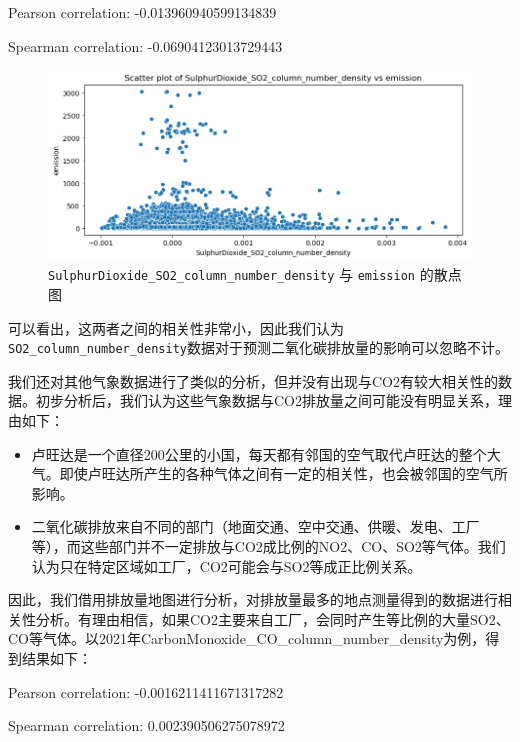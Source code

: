 \documentclass{ctexart}
\begin{document}
\begin{center}
Pearson correlation: -0.013960940599134839

Spearman correlation: -0.06904123013729443
\end{center}


\begin{figure}[H]
      \centering
      \includegraphics[width=1\textwidth]{output1.png}
      \caption{\label{fig:1}\texttt{SulphurDioxide\_SO2\_column\_number\_density} 与 \texttt{emission} 的散点图}
\end{figure}

可以看出，这两者之间的相关性非常小，因此我们认为\texttt{SO2\_column\_number\_density}数据对于预测二氧化碳排放量的影响可以忽略不计。

我们还对其他气象数据进行了类似的分析，但并没有出现与CO2有较大相关性的数据。初步分析后，我们认为这些气象数据与CO2排放量之间可能没有明显关系，理由如下：

\begin{itemize}
      \item 卢旺达是一个直径200公里的小国，每天都有邻国的空气取代卢旺达的整个大气。即使卢旺达所产生的各种气体之间有一定的相关性，也会被邻国的空气所影响。
      \item 二氧化碳排放来自不同的部门（地面交通、空中交通、供暖、发电、工厂等），而这些部门并不一定排放与CO2成比例的NO2、CO、SO2等气体。我们认为只在特定区域如工厂，CO2可能会与SO2等成正比例关系。
\end{itemize}

因此，我们借用排放量地图进行分析，对排放量最多的地点测量得到的数据进行相关性分析。有理由相信，如果CO2主要来自工厂，会同时产生等比例的大量SO2、CO等气体。以2021年CarbonMonoxide\_CO\_column\_number\_density为例，得到结果如下：

\begin{center}
      Pearson correlation: -0.0016211411671317282

      Spearman correlation: 0.002390506275078972
\end{center}
\end{document}
